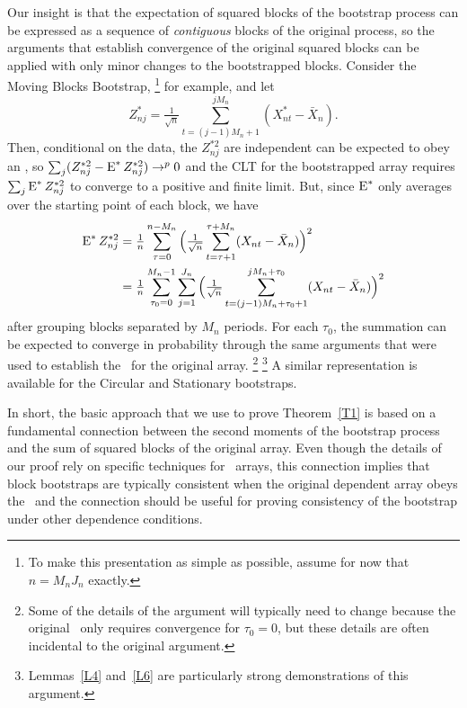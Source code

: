 \documentclass[11pt]{article}
\providecommand{\DIFadd}[1]{{\protect\color{blue}\uwave{#1}}} %
\providecommand{\DIFaddbegin}{} %
\providecommand{\DIFaddend}{} %
\begin{document}
Our insight is that the expectation of squared blocks of the bootstrap
process can be expressed as a sequence of \emph{contiguous} blocks of
the original process, so the arguments that establish convergence of
the original squared blocks can be applied with only minor changes to
the bootstrapped blocks. Consider the Moving Blocks Bootstrap,%
\footnote{To make this presentation as simple as possible, assume for
  now that $n = M_n J_n$ exactly.} %
for example, and let
\begin{equation*}
  Z_{nj}^* = \tfrac{1}{\sqrt{n}} \sum_{t=(j-1) M_n + 1}^{j M_n} (X_{nt}^* - \bar X_n).
\end{equation*}
Then, conditional on the data, the $Z_{nj}^{*2}$ are independent \DIFaddbegin \DIFadd{and }\DIFaddend can
be expected to obey an \lln, so %
$\sum_j (Z_{nj}^{*2} - \operatorname{E}^* Z_{nj}^{*2}) \to^p 0$ %
and the CLT for the bootstrapped array requires $\sum_j \operatorname{E}^*
Z_{nj}^{*2}$ to converge to a positive and finite limit.  But, since
$\operatorname{E}^*$ only averages over the starting point of each block, we have
\begin{align*}
  \operatorname{E}^* Z_{nj}^{*2} &=
  \tfrac{1}{n} \sum_{\tau = 0}^{n-M_n}
  \Big(\tfrac{1}{\sqrt{n}}
  \sum_{t= \tau + 1}^{\tau + M_n} (X_{nt} - \bar X_n) \Big)^2 \\
  &= \tfrac{1}{n} \sum_{\tau_0 = 0}^{M_n-1}
  \sum_{j=1}^{J_n}
  \Big(\tfrac{1}{\sqrt{n}}
  \sum_{t= (j - 1) M_n + \tau_0 + 1}^{j M_n + \tau_0} (X_{nt} - \bar X_n) \Big)^2
\end{align*}
after grouping blocks separated by $M_n$ periods. For each $\tau_0$,
the summation can be expected to converge in probability through the
same arguments that were used to establish the \clt\ for the original
array.%
\footnote{Some of the details of the argument will typically need to
  change because the original \clt\ only requires convergence for
  $\tau_0 = 0$, but these details are often incidental to the original
  argument.}%
\footnote{Lemmas~\ref{L4} and~\ref{L6} are particularly
  strong demonstrations of this argument.} %
A similar representation is available for the Circular and Stationary
bootstraps.

In short, the basic approach that we use to prove Theorem~\ref{T1}
is based on a fundamental connection between the second moments of the
bootstrap process and the sum of squared blocks of the original
array. Even though the details of our proof rely on specific
techniques for \ned\ arrays, this connection implies that block
bootstraps are typically consistent when the original dependent array
obeys the \clt\ and the connection should be useful for proving
consistency of the bootstrap under other dependence conditions.
\end{document}
